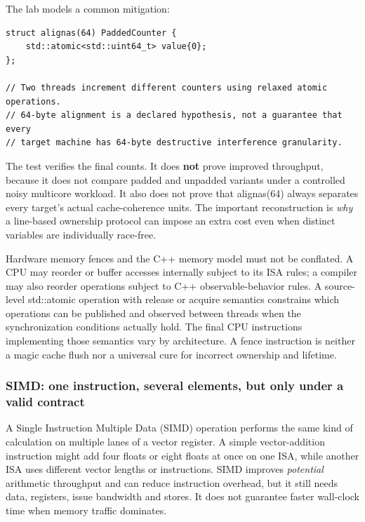 The lab models a common mitigation:

\begin{verbatim}
struct alignas(64) PaddedCounter {
    std::atomic<std::uint64_t> value{0};
};

// Two threads increment different counters using relaxed atomic operations.
// 64-byte alignment is a declared hypothesis, not a guarantee that every
// target machine has 64-byte destructive interference granularity.
\end{verbatim}

The test verifies the final counts. It does \textbf{not} prove improved throughput, because it does not compare padded and unpadded variants under a controlled noisy multicore workload. It also does not prove that alignas(64) always separates every target's actual cache-coherence units. The important reconstruction is \emph{why} a line-based ownership protocol can impose an extra cost even when distinct variables are individually race-free.

Hardware memory fences and the C++ memory model must not be conflated. A CPU may reorder or buffer accesses internally subject to its ISA rules; a compiler may also reorder operations subject to C++ observable-behavior rules. A source-level std::atomic operation with release or acquire semantics constrains which operations can be published and observed between threads when the synchronization conditions actually hold. The final CPU instructions implementing those semantics vary by architecture. A fence instruction is neither a magic cache flush nor a universal cure for incorrect ownership and lifetime.

\subsubsection{SIMD: one instruction, several elements, but only under a valid contract}\label{simd-one-instruction-several-elements-but-only-under-a-valid-contract}

A Single Instruction Multiple Data (SIMD) operation performs the same kind of calculation on multiple lanes of a vector register. A simple vector-addition instruction might add four floats or eight floats at once on one ISA, while another ISA uses different vector lengths or instructions. SIMD improves \emph{potential} arithmetic throughput and can reduce instruction overhead, but it still needs data, registers, issue bandwidth and stores. It does not guarantee faster wall-clock time when memory traffic dominates.


